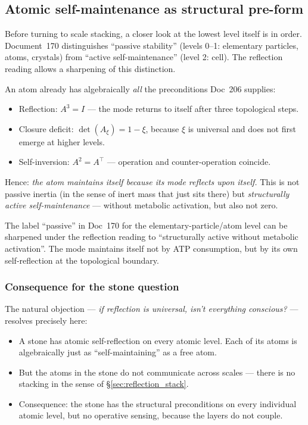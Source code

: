 \subsection{Atomic self-maintenance as structural pre-form}\label{sec:reflection_atom}

Before turning to scale stacking, a closer look at the lowest level itself is in order. Document~170 distinguishes ``passive stability'' (levels 0--1: elementary particles, atoms, crystals) from ``active self-maintenance'' (level 2: cell). The reflection reading allows a sharpening of this distinction.

An atom already has algebraically \emph{all} the preconditions Doc~206 supplies:

\begin{itemize}
\item Reflection: $A^3 = I$ --- the mode returns to itself after three topological steps.
\item Closure deficit: $\det(A_\xi) = 1 - \xi$, because $\xi$ is universal and does not first emerge at higher levels.
\item Self-inversion: $A^2 = A^\top$ --- operation and counter-operation coincide.
\end{itemize}

Hence: \emph{the atom maintains itself because its mode reflects upon itself.} This is not passive inertia (in the sense of inert mass that just sits there) but \emph{structurally active self-maintenance} --- without metabolic activation, but also not zero.

\begin{insightBox}
The label ``passive'' in Doc~170 for the elementary-particle/atom level can be sharpened under the reflection reading to ``structurally active without metabolic activation''. The mode maintains itself not by ATP consumption, but by its own self-reflection at the topological boundary.
\end{insightBox}

\subsubsection*{Consequence for the stone question}

The natural objection --- \emph{if reflection is universal, isn't everything conscious?} --- resolves precisely here:

\begin{itemize}
\item A stone has atomic self-reflection on every atomic level. Each of its atoms is algebraically just as ``self-maintaining'' as a free atom.
\item But the atoms in the stone do not communicate across scales --- there is no stacking in the sense of \S\ref{sec:reflection_stack}.
\item Consequence: the stone has the structural preconditions on every individual atomic level, but no operative sensing, because the layers do not couple.
\end{itemize}

